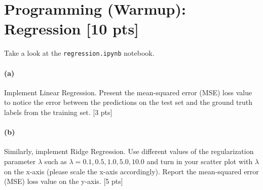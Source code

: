 \documentclass[twoside,10pt]{article}
\begin{document}







\section{Programming (Warmup): Regression [10 pts]} 

Take a look at the \texttt{regression.ipynb} notebook.  

\paragraph{(a)} Implement Linear Regression. Present the mean-squared error (MSE) loss value to notice the error  between the predictions on the test set and the ground truth labels from the training set. [3 pts]

\paragraph{(b)} Similarly, implement Ridge Regression. Use different values of the regularization parameter $\lambda$ such as $\lambda = 0.1, 0.5, 1.0, 5.0, 10.0$ and turn in your scatter plot with $\lambda$ on the x-axis (please scale the x-axis accordingly). Report the mean-squared error (MSE) loss value on the y-axis.  [5 pts] 
\end{document}
